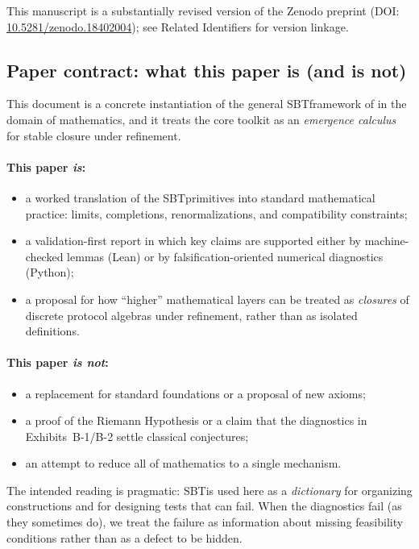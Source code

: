 \documentclass[apajournal,article,submit,moreauthors,pdftex]{Definitions/mdpi}
\newcommand{\SBT}{\textsc{SBT}}
\begin{document}
This manuscript is a substantially revised version of the Zenodo preprint (DOI: \href{https://doi.org/10.5281/zenodo.18402004}{10.5281/zenodo.18402004}); see Related Identifiers for version linkage.

\subsection{Paper contract: what this paper is (and is not)}
This document is a concrete instantiation of the general \SBT framework of \cite{SixBirdsFramework} in the domain of mathematics, and it treats the core toolkit as an \emph{emergence calculus} for stable closure under refinement.

\paragraph{This paper \emph{is}:}
\begin{itemize}
  \item a worked translation of the \SBT primitives into standard mathematical practice: limits, completions, renormalizations, and compatibility constraints;
  \item a validation-first report in which key claims are supported either by machine-checked lemmas (Lean) or by falsification-oriented numerical diagnostics (Python);
  \item a proposal for how ``higher'' mathematical layers can be treated as \emph{closures} of discrete protocol algebras under refinement, rather than as isolated definitions.
\end{itemize}

\paragraph{This paper \emph{is not}:}
\begin{itemize}
  \item a replacement for standard foundations or a proposal of new axioms;
  \item a proof of the Riemann Hypothesis or a claim that the diagnostics in Exhibits~B-1/B-2 settle classical conjectures;
  \item an attempt to reduce all of mathematics to a single mechanism.
\end{itemize}

The intended reading is pragmatic: \SBT is used here as a \emph{dictionary} for organizing constructions and for designing tests that can fail.
When the diagnostics fail (as they sometimes do), we treat the failure as information about missing feasibility conditions rather than as a defect to be hidden.
\end{document}
